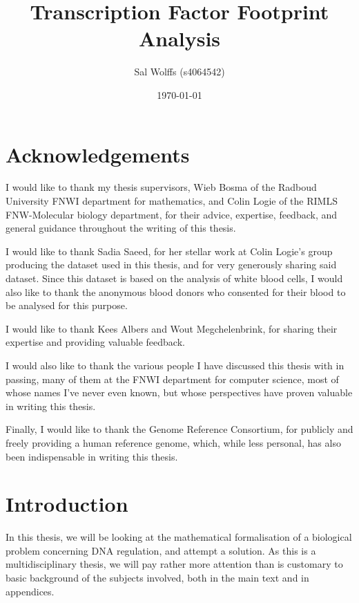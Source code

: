 \documentclass[fleqn]{book}
\title{Transcription Factor Footprint Analysis}
\author{Sal Wolffs (s4064542)}
\date{\today}
\begin{document}
\maketitle

{
\setcounter{tocdepth}{2}
\tableofcontents
}
\newcommand{\nA}{\text A}
\newcommand{\nC}{\text C}
\newcommand{\nT}{\text T}
\newcommand{\nG}{\text G}

\newcommand{\Sequences}{\text{Sequences}}
\newcommand{\Locations}{\text{Locations}}
\newcommand{\lookup}{\operatorname{lookup}}
\newcommand{\Wildcard}{\text{Wildcard}}
\newcommand{\join}{\operatorname{join}}

\chapter{Acknowledgements}\label{acknowledgements}

I would like to thank my thesis supervisors, Wieb Bosma of the Radboud
University FNWI department for mathematics, and Colin Logie of the RIMLS
FNW-Molecular biology department, for their advice, expertise, feedback,
and general guidance throughout the writing of this thesis.

I would like to thank Sadia Saeed, for her stellar work at Colin Logie's
group producing the dataset used in this thesis, and for very generously
sharing said dataset. Since this dataset is based on the analysis of
white blood cells, I would also like to thank the anonymous blood donors
who consented for their blood to be analysed for this purpose.

I would like to thank Kees Albers and Wout Megchelenbrink, for sharing
their expertise and providing valuable feedback.

I would also like to thank the various people I have discussed this
thesis with in passing, many of them at the FNWI department for computer
science, most of whose names I've never even known, but whose
perspectives have proven valuable in writing this thesis.

Finally, I would like to thank the Genome Reference Consortium, for
publicly and freely providing a human reference genome, which, while
less personal, has also been indispensable in writing this thesis.

\chapter{Introduction}\label{introduction}

In this thesis, we will be looking at the mathematical formalisation of
a biological problem concerning DNA regulation, and attempt a solution.
As this is a multidisciplinary thesis, we will pay rather more attention
than is customary to basic background of the subjects involved, both in
the main text and in appendices.
\end{document}
